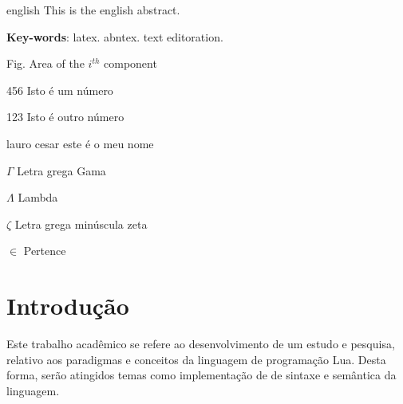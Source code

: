 \documentclass[
	12pt,				%
	openright,			%
	twoside,			%
	a4paper,			%
	english,			%
	brazil,				%
	]{abntex2}
\begin{document}
\begin{resumo}[Abstract]
 \begin{otherlanguage*}{english}
   This is the english abstract.

   \vspace{\onelineskip}
 
   \noindent 
   \textbf{Key-words}: latex. abntex. text editoration.
 \end{otherlanguage*}
\end{resumo}

\listoffigures*
\cleardoublepage

\listoftables*
\cleardoublepage

\begin{siglas}
  \item[Fig.] Area of the $i^{th}$ component
  \item[456] Isto é um número
  \item[123] Isto é outro número
  \item[lauro cesar] este é o meu nome
\end{siglas}

\begin{simbolos}
  \item[$ \Gamma $] Letra grega Gama
  \item[$ \Lambda $] Lambda
  \item[$ \zeta $] Letra grega minúscula zeta
  \item[$ \in $] Pertence
\end{simbolos}

\tableofcontents*
\cleardoublepage

\textual

\chapter{Introdução}
Este trabalho acadêmico se refere ao desenvolvimento de um estudo e pesquisa, relativo aos paradigmas e conceitos da linguagem de programação Lua. Desta forma, serão atingidos temas como implementação de de sintaxe e semântica da linguagem.
\end{document}
